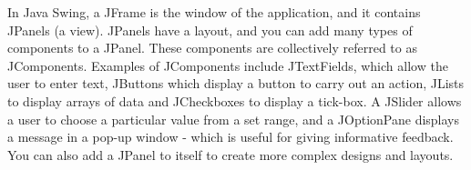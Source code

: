 In Java Swing, a JFrame is the window of the application, and it contains JPanels (a view). JPanels have a layout, and you can add many types of components to a JPanel. These components are collectively referred to as JComponents. Examples of JComponents include JTextFields, which allow the user to enter text, JButtons which display a button to carry out an action, JLists to display arrays of data and JCheckboxes to display a tick-box. A JSlider allows a user to choose a particular value from a set range, and a JOptionPane displays a message in a pop-up window - which is useful for giving informative feedback. You can also add a JPanel to itself to create more complex designs and layouts.

